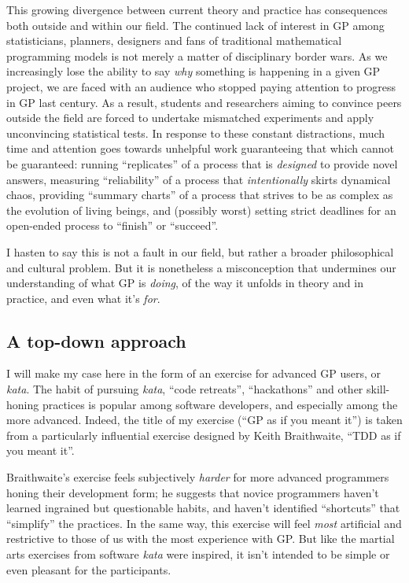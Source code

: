 This growing divergence between current theory and practice has consequences both outside and within our field. The continued lack of interest in GP among statisticians, planners, designers and fans of traditional mathematical programming models is not merely a matter of disciplinary border wars. As we increasingly lose the ability to say \emph{why} something is happening in a given GP project, we are faced with an audience who stopped paying attention to progress in GP last century. As a result, students and researchers aiming to convince peers outside the field are forced to undertake mismatched experiments and apply unconvincing statistical tests. In response to these constant distractions, much time and attention goes towards unhelpful work guaranteeing that which cannot be guaranteed: running ``replicates'' of a process that is \emph{designed} to provide novel answers, measuring ``reliability'' of a process that \emph{intentionally} skirts dynamical chaos, providing ``summary charts'' of a process that strives to be as complex as the evolution of living beings, and (possibly worst) setting strict deadlines for an open-ended process to ``finish'' or ``succeed''.

I hasten to say this is not a fault in our field, but rather a broader philosophical and cultural problem. But it is nonetheless a misconception that undermines our understanding of what GP is \emph{doing}, of the way it unfolds in theory and in practice, and even what it's \emph{for}.

\subsection{A top-down approach}\hypertarget{a-top-down-approach}{}\label{a-top-down-approach}

I will make my case here in the form of an exercise for advanced GP users, or \emph{kata}. The habit of pursuing \emph{kata}, ``code retreats'', ``hackathons'' and other skill-honing practices is popular among software developers, and especially among the more advanced. Indeed, the title of my exercise (``GP as if you meant it'') is taken from a particularly influential exercise designed by Keith Braithwaite, ``TDD as if you meant it''.

Braithwaite's exercise feels subjectively \emph{harder} for more advanced programmers honing their development form; he suggests that novice programmers haven't learned ingrained but questionable habits, and haven't identified ``shortcuts'' that ``simplify'' the practices. In the same way, this exercise will feel \emph{most} artificial and restrictive to those of us with the most experience with GP. But like the martial arts exercises from software \emph{kata} were inspired, it isn't intended to be simple or even pleasant for the participants.

